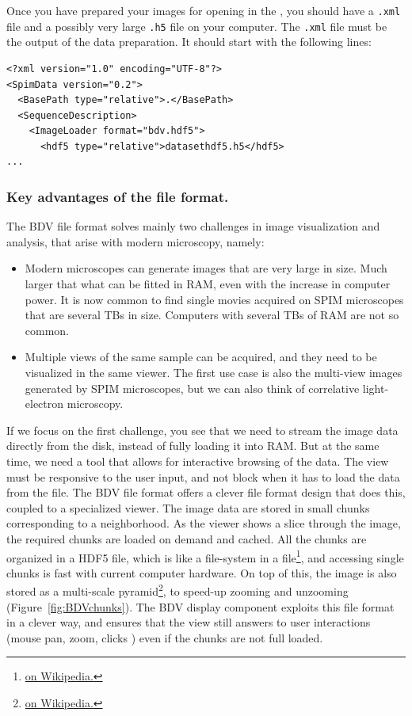 Once you have prepared your images for opening in the \bdv, you should have a \texttt{.xml} file and a possibly very large \texttt{.h5} file on your computer. The \texttt{.xml} file must be the output of the \bdv data preparation. It should start with the following lines:
\begin{verbatim}
<?xml version="1.0" encoding="UTF-8"?>
<SpimData version="0.2">
  <BasePath type="relative">.</BasePath>
  <SequenceDescription>
    <ImageLoader format="bdv.hdf5">
      <hdf5 type="relative">datasethdf5.h5</hdf5>
...
\end{verbatim}


\subsubsection{Key advantages of the \Bdv file format.}

The BDV file format solves mainly two challenges in image visualization and analysis, that arise with modern microscopy, namely:
\begin{itemize}
    
    \item Modern microscopes can generate images that are very large in size. Much larger that what can be fitted in RAM, even with the increase in computer power. It is now common to find single movies acquired on SPIM microscopes that are several TBs in size. Computers with several TBs of RAM are not so common.
    
    \item Multiple views of the same sample can be acquired, and they need to be visualized in the same viewer. The first use case is also the multi-view images generated by SPIM microscopes, but we can also think of correlative light-electron microscopy.
    
\end{itemize}

If we focus on the first challenge, you see that we need to stream the image data directly from the disk, instead of fully loading it into RAM. 
But at the same time, we need a tool that allows for interactive browsing of the data. 
The view must be responsive to the user input, and not block when it has to load the data from the file. 
The BDV file format offers a clever file format design that does this, coupled to a specialized viewer.
The image data are stored in small chunks corresponding to a neighborhood. As the viewer shows a slice through the image, the required chunks are loaded on demand and cached.
All the chunks are organized in a HDF5 file, which is like a file-system in a file\footnote{\href{https://en.wikipedia.org/wiki/Hierarchical_Data_Format}{ on Wikipedia.}}, and accessing single chunks is fast with current computer hardware.
On top of this, the image is also stored as a multi-scale pyramid\footnote{\href{https://en.wikipedia.org/wiki/Pyramid_(image_processing)}{ on Wikipedia.}}, to speed-up zooming and unzooming (Figure~\ref{fig:BDVchunks}).
The BDV display component exploits this file format in a clever way, and ensures that the view still answers to user interactions (mouse pan, zoom, clicks \etc) even if the chunks are not full loaded.

